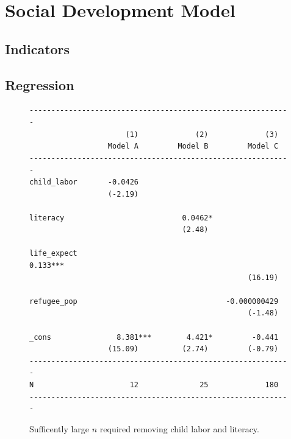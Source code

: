 \documentclass[11pt]{article}
\begin{document}
\section{Social Development Model}
\label{sec:model_social}

\subsection{Indicators}

\subsection{Regression}

\begin{figure}[!ht]
\begin{singlespace}
\small
\begin{verbatim}
------------------------------------------------------------
                      (1)             (2)             (3)
                  Model A         Model B         Model C
------------------------------------------------------------
child_labor       -0.0426
                  (-2.19)

literacy                           0.0462*
                                   (2.48)

life_expect                                         0.133***
                                                  (16.19)

refugee_pop                                  -0.000000429
                                                  (-1.48)

_cons               8.381***        4.421*         -0.441
                  (15.09)          (2.74)         (-0.79)
------------------------------------------------------------
N                      12              25             180
------------------------------------------------------------
\end{verbatim}
\end{singlespace}
\caption{\label{social_development_model_regressions}Sufficently large $n$ required removing child labor and literacy.}
\end{figure}
\end{document}
